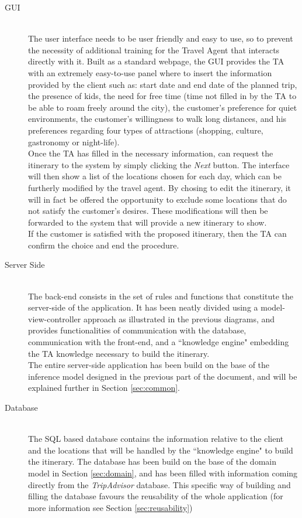 \documentclass[11pt]{article} %
\begin{document}
\begin{description}
\item[GUI] \hfill \\
The user interface needs to be user friendly and easy to use, so to prevent the necessity of additional training for the Travel Agent that interacts directly with it. Built as a standard webpage, the GUI provides the TA with an extremely easy-to-use panel where to insert the information provided by the client such as: start date and end date of the planned trip, the presence of kids, the need for free time (time not filled in by the TA to be able to roam freely around the city), the customer's preference for quiet environments, the customer's willingness to walk long distances, and his preferences regarding four types of attractions (shopping, culture, gastronomy or night-life).\\
Once the TA has filled in the necessary information, can request the itinerary to the system by simply clicking the \textit{Next} button. The interface will then show a list of the locations chosen for each day, which can be furtherly modified by the travel agent. By chosing to edit the itinerary, it will in fact be offered the opportunity to exclude some locations that do not satisfy the customer's desires. These modifications will then be forwarded to the system that will provide a new itinerary to show.\\
If the customer is satisfied with the proposed itinerary, then the TA can confirm the choice and end the procedure.
\item[Server Side] \hfill \\
The back-end consists in the set of rules and functions that constitute the server-side of the application. It has been neatly divided using a model-view-controller approach as illustrated in the previous diagrams, and provides functionalities of communication with the database, communication with the front-end, and a ``knowledge engine" embedding the TA knowledge necessary to build the itinerary.\\
The entire server-side application has been build on the base of the inference model designed in the previous part of the document, and will be explained further in Section \ref{sec:common}.
\item[Database] \hfill \\
The SQL based database contains the information relative to the client and the locations that will be handled by the ``knowledge engine" to build the itinerary. The database has been build on the base of the domain model in Section \ref{sec:domain}, and has been filled with information coming directly from the \textit{TripAdvisor} database. This specific way of building and filling the database favours the reusability of the whole application (for more information see Section \ref{sec:reusability})
\end{description}
\end{document}

